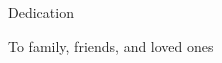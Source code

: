 %
%
% 
%
%

\vspace*{1cm}


\begin{center}
{\large Dedication}

To family, friends, and loved ones

\end{center}

\clearpage
